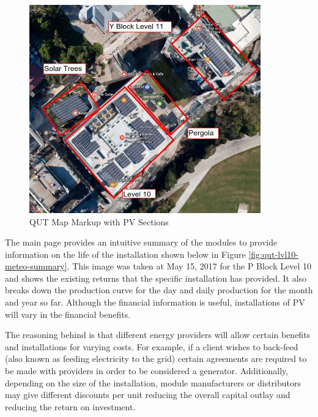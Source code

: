 \begin{figure}[H]
	\hfill\includegraphics[width=100mm]{images/metering/meteo/pblock-map}\hspace*{\fill}
	\caption{QUT Map Markup with PV Sections} 
	\label{fig:qut-map-pv-markup}
\end{figure}



The main page provides an intuitive summary of the modules to provide information on the life of the installation shown below in Figure \ref{fig:qut-lvl10-meteo-summary}. This image was taken at May 15, 2017 for the P Block Level 10 and shows the existing returns that the specific installation has provided. It also breaks down the production curve for the day and daily production for the month and year so far. Although the financial information is useful, installations of PV will vary in the financial benefits. 
\newline

The reasoning behind is that different energy providers will allow certain benefits and installations for varying costs. For example, if a client wishes to back-feed (also known as feeding electricity to the grid) certain agreements are required to be made with providers in order to be considered a generator. Additionally, depending on the size of the installation, module manufacturers or distributors may give different discounts per unit reducing the overall capital outlay and reducing the return on investment.       

